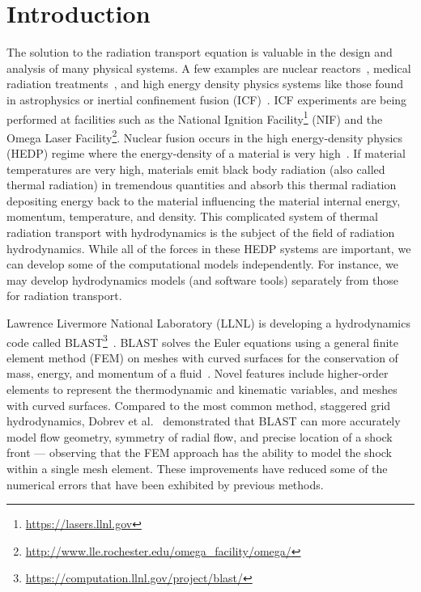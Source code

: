 \documentclass[12pt,letterpaper]{article}
\begin{document}
\section{Introduction}
The solution to the radiation transport equation is valuable in the design and analysis of many physical systems. A few examples are nuclear reactors~\cite{D&H}, medical radiation treatments~\cite{Sandwall2018Brachytherapy}, and high energy density physics systems like those found in astrophysics or inertial confinement fusion (ICF)~\cite{Castor_Rad_Hydro}. ICF experiments are being performed at facilities such as the National Ignition Facility\footnote{\url{https://lasers.llnl.gov}} (NIF) and the Omega Laser Facility\footnote{\url{http://www.lle.rochester.edu/omega_facility/omega/}}. Nuclear fusion occurs in the high energy-density physics (HEDP) regime where the energy-density of a material is very high~\cite{Castor_Rad_Hydro,DrakeHEDPPaper}. If material temperatures are very high, materials emit black body radiation (also called thermal radiation) in tremendous quantities and absorb this thermal radiation depositing energy back to the material influencing the material internal energy, momentum, temperature, and density. This complicated system of thermal radiation transport with hydrodynamics is the subject of the field of radiation hydrodynamics. While all of the forces in these HEDP systems are important, we can develop some of the computational models independently. For instance, we may develop hydrodynamics models (and software tools) separately from those for radiation transport.

Lawrence Livermore National Laboratory (LLNL) is developing a hydrodynamics code called BLAST\footnote{\url{https://computation.llnl.gov/project/blast/}}~\cite{DobrevHOFEMHydro}. BLAST solves the Euler equations using a general finite element method (FEM) on meshes with curved surfaces for the conservation of mass, energy, and momentum of a fluid~\cite{DobrevCurvilinearFEMHydro}. Novel features include higher-order elements to represent the thermodynamic and kinematic variables, and meshes with curved surfaces. Compared to the most common method, staggered grid hydrodynamics, Dobrev et al.~\cite{DobrevCurvilinearFEMHydro} demonstrated that BLAST can more accurately model flow geometry, symmetry of radial flow, and precise location of a shock front --- observing that the FEM approach has the ability to model the shock within a single mesh element. These improvements have reduced some of the numerical errors that have been exhibited by previous methods.
\end{document}
